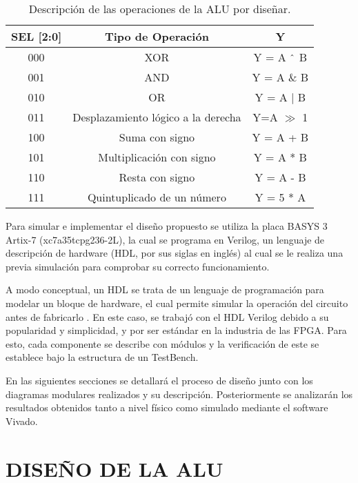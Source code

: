 \documentclass[journal,trans]{IEEEtran}
\begin{document}
\begin{table}[!h]
  \begin{center}
    \caption{Descripción de las operaciones de la ALU por diseñar.}
    \label{tab:operaciones}
    \begin{tabular}{c | c | c }
      \hline
      SEL [2:0] & Tipo de Operación & Y \\
      \hline
       000 & XOR & Y = A $\string^$ B \\
       \hline
       001 & AND & Y = A $\&$ B \\
       \hline
       010 & OR & Y = A $\mid$ B \\
       \hline
       011 & Desplazamiento lógico a la derecha & Y=A $\gg$ 1 \\
       \hline
       100 & Suma con signo & Y = A + B \\
       \hline
       101 & Multiplicación con signo & Y = A * B \\
       \hline
       110 & Resta con signo & Y = A - B \\
       \hline
       111 & Quintuplicado de un número & Y = 5 * A \\
      \hline
    \end{tabular}
  \end{center}
\end{table}

Para simular e implementar el diseño propuesto se utiliza la placa BASYS 3 Artix-7 (xc7a35tcpg236-2L), la cual se programa en Verilog, un lenguaje de descripción de hardware (HDL, por sus siglas en inglés) al cual se le realiza una previa simulación para comprobar su correcto funcionamiento.

A modo conceptual, un HDL se trata de un lenguaje de programación para modelar un bloque de hardware, el cual permite simular la operación del circuito antes de fabricarlo \cite{Paulino}. En este caso, se trabajó con el HDL Verilog debido a su popularidad y simplicidad, y por ser estándar en la industria de las FPGA. Para esto, cada componente se describe con módulos y la verificación de este se establece bajo la estructura de un TestBench.

En las siguientes secciones se detallará el proceso de diseño junto con los diagramas modulares realizados y su descripción. Posteriormente se analizarán los resultados obtenidos tanto a nivel físico como simulado mediante el software Vivado. 


\section{DISEÑO DE LA ALU}
\end{document}
